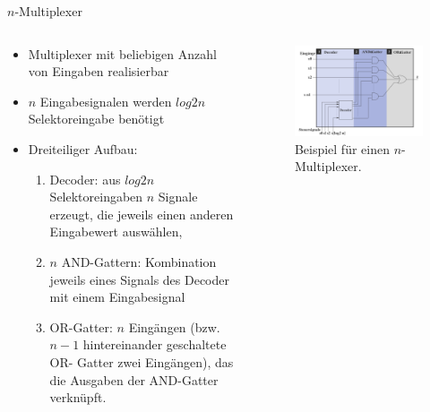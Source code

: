 \documentclass[12pt%
,xcolor=table
,aspectratio=169%
]{beamer}
\begin{document}
\begin{frame}{$n$-Multiplexer}
\begin{columns}[T] %
\begin{column}{.6\textwidth}
\begin{itemize}
	\item Multiplexer mit beliebigen Anzahl von Eingaben realisierbar
	\item $n$ Eingabesignalen werden $log 2 n$ Selektoreingabe benötigt
	\item Dreiteiliger Aufbau:
	\begin{enumerate}
		\item Decoder: aus $log 2 n$ Selektoreingaben $n$ Signale erzeugt, die jeweils einen anderen Eingabewert auswählen,
		\item $n$ AND-Gattern: Kombination jeweils eines Signals des Decoder mit einem Eingabesignal 
		\item OR-Gatter: $n$ Eingängen (bzw. $n-1$ hintereinander geschaltete OR- Gatter zwei Eingängen), das die Ausgaben der AND-Gatter verknüpft.
	\end{enumerate}
\end{itemize}
\end{column}%
\hfill%
\begin{column}{.48\textwidth}
\centering
\begin{figure}
\includegraphics[scale=0.3]{pictures/nmux}
\caption{Beispiel für einen $n$-Multiplexer.}
\end{figure}
\end{column}%
\end{columns}
\end{frame}
\end{document}
